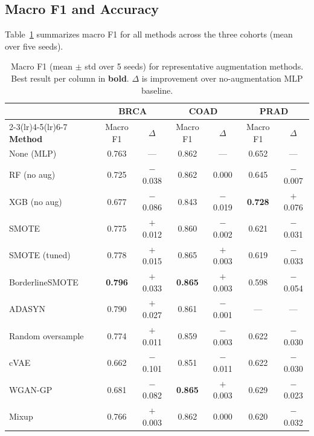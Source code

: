 \documentclass{article}
\begin{document}
\subsection{Macro F1 and Accuracy}

Table~\ref{tab:main} summarizes macro F1 for all methods across the three cohorts (mean over
five seeds).

\begin{table}[htbp]
  \centering
  \caption{Macro F1 (mean $\pm$ std over 5 seeds) for representative augmentation methods.
    Best result per column in \textbf{bold}. $\Delta$ is improvement over no-augmentation MLP baseline.}
  \label{tab:main}
  \small
  \begin{tabular}{lcccccc}
    \toprule
    & \multicolumn{2}{c}{\textbf{BRCA}} & \multicolumn{2}{c}{\textbf{COAD}} & \multicolumn{2}{c}{\textbf{PRAD}} \\
    \cmidrule(lr){2-3}\cmidrule(lr){4-5}\cmidrule(lr){6-7}
    \textbf{Method} & Macro F1 & $\Delta$ & Macro F1 & $\Delta$ & Macro F1 & $\Delta$ \\
    \midrule
    None (MLP)         & 0.763 & ---   & 0.862 & ---   & 0.652 & --- \\
    RF (no aug)        & 0.725 & $-$0.038 & 0.862 & 0.000 & 0.645 & $-$0.007 \\
    XGB (no aug)       & 0.677 & $-$0.086 & 0.843 & $-$0.019 & \textbf{0.728} & $+$0.076 \\
    \midrule
    SMOTE              & 0.775 & $+$0.012 & 0.860 & $-$0.002 & 0.621 & $-$0.031 \\
    SMOTE (tuned)      & 0.778 & $+$0.015 & 0.865 & $+$0.003 & 0.619 & $-$0.033 \\
    BorderlineSMOTE    & \textbf{0.796} & $+$0.033 & \textbf{0.865} & $+$0.003 & 0.598 & $-$0.054 \\
    ADASYN             & 0.790 & $+$0.027 & 0.861 & $-$0.001 & --- & --- \\
    Random oversample  & 0.774 & $+$0.011 & 0.859 & $-$0.003 & 0.622 & $-$0.030 \\
    cVAE               & 0.662 & $-$0.101 & 0.851 & $-$0.011 & 0.622 & $-$0.030 \\
    WGAN-GP            & 0.681 & $-$0.082 & \textbf{0.865} & $+$0.003 & 0.629 & $-$0.023 \\
    Mixup              & 0.766 & $+$0.003 & 0.862 & 0.000 & 0.620 & $-$0.032 \\
    \bottomrule
  \end{tabular}
\end{table}
\end{document}
